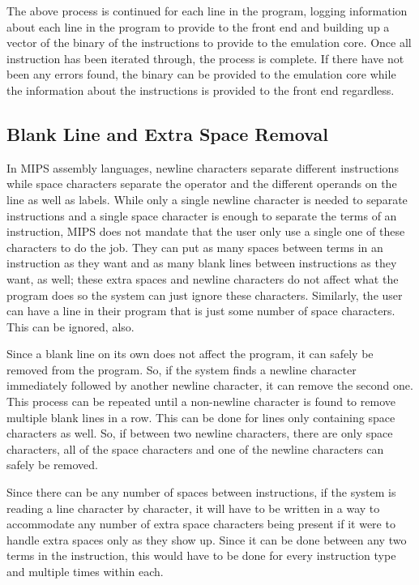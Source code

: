 \documentclass[
    parskip=half,
    fontsize=12pt,
    titlepage=firstiscover,
    toc=bibliography,
    numbers=endperiod
]{scrartcl}
\begin{document}
The above process is continued for each line in the program, logging
information about each line in the program to provide to the front end
and building up a vector of the binary of the instructions to provide to
the emulation core. Once all instruction has been iterated through, the
process is complete. If there have not been any errors found, the binary
can be provided to the emulation core while the information about the
instructions is provided to the front end regardless.

\subsection{Blank Line and Extra Space Removal}

In MIPS assembly languages, newline characters separate different
instructions while space characters separate the operator and the
different operands on the line as well as labels. While only a single
newline character is needed to separate instructions and a single space
character is enough to separate the terms of an instruction, MIPS does
not mandate that the user only use a single one of these characters to
do the job. They can put as many spaces between terms in an instruction
as they want and as many blank lines between instructions as they want,
as well; these extra spaces and newline characters do not affect what
the program does so the system can just ignore these characters.
Similarly, the user can have a line in their program that is just some
number of space characters. This can be ignored, also.

Since a blank line on its own does not affect the program, it can safely
be removed from the program. So, if the system finds a newline character
immediately followed by another newline character, it can remove the
second one. This process can be repeated until a non-newline character
is found to remove multiple blank lines in a row. This can be done for
lines only containing space characters as well. So, if between two
newline characters, there are only space characters, all of the space
characters and one of the newline characters can safely be removed.

Since there can be any number of spaces between instructions, if the
system is reading a line character by character, it will have to be
written in a way to accommodate any number of extra space characters
being present if it were to handle extra spaces only as they show up.
Since it can be done between any two terms in the instruction, this
would have to be done for every instruction type and multiple times
within each.
\end{document}
